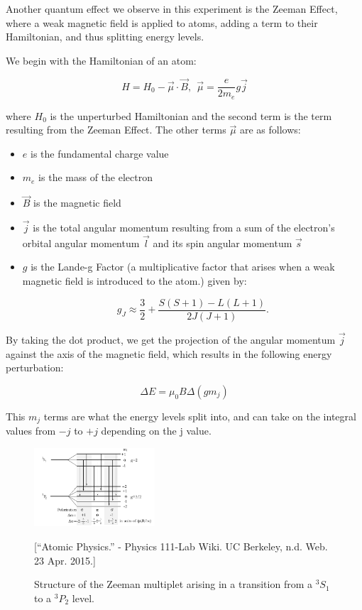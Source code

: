 Another quantum effect we observe in this experiment is the Zeeman Effect, where a weak magnetic field is applied to atoms, adding a term to their Hamiltonian, and thus splitting energy levels. 

We begin with the Hamiltonian of an atom: 

\begin{equation}
    H = H_0 -\vec{\mu} \cdot \vec{B}, \: \: \vec\mu =\frac{e}{2m_e}g\vec j
  \label{Hamiltonian}
\end{equation}

where $H_0$ is the unperturbed Hamiltonian and the second term is the term resulting from the Zeeman Effect. The other terms $\vec\mu$ are as follows: 

\begin{itemize}
 \item $e$ is the fundamental charge value
 \item $m_e$ is the mass of the electron
 \item $\vec B$ is the magnetic field
 \item $\vec j$ is the total angular momentum resulting from a sum of the electron's orbital angular momentum $\vec l$ and its spin angular momentum $\vec s$
 \item $g$ is the Lande-g Factor (a multiplicative factor that arises when a weak magnetic field is introduced to the atom.) given by:

\begin{equation}
  g_J \approx \frac{3}{2}+\frac{S(S+1)-L(L+1)}{2J(J+1)}. 
  \label{Lande G}
\end{equation}

\end{itemize}

By taking the dot product, we get the projection of the angular momentum $\vec j$ against the axis of the magnetic field, which results in the following energy perturbation:

\begin{equation} 
  \Delta E = \mu_0 B \Delta (g m_j)
  \label{Zeeman Energies}
\end{equation}

This $m_j$ terms are what the energy levels split into, and can take on the integral values from $-j$ to $+j$ depending on the j value. 

\begin{figure}[t]
  \includegraphics[width = 0.4\textwidth]{ZeemanSplitting.png}
  \begin{center}
  \caption{Structure of the Zeeman multiplet arising in a transition from a $^{3}S_1$ to a $^{3}P_2$ level.}[\footnotesize{``Atomic Physics.'' - Physics 111-Lab Wiki. UC Berkeley, n.d. Web. 23 Apr. 2015.}]
  \label{ZeemanSplitting}
  \end{center}
\end{figure}

